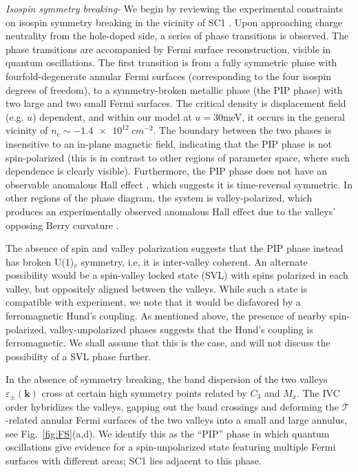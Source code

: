 \documentclass[aps,pra,twocolumn,superscriptaddress,10pt,article,nofootinbib,showpacs,longbibliography]{revtex4-1}
\begin{document}
\emph{Isospin symmetry breaking-}
We begin by reviewing the experimental constraints on isospin symmetry breaking in the vicinity of SC1 \cite{Zhou2021_ABCmetals,Zhou_ABCSC}.
Upon approaching charge neutrality from  the  hole-doped  side,  a  series  of  phase  transitions  is  observed. 
The phase transitions are accompanied by Fermi surface reconstruction, visible in quantum oscillations.
The first transition is from a fully symmetric phase with fourfold-degenerate annular Fermi surfaces (corresponding to the four isospin degrees of freedom), to a symmetry-broken metallic phase (the PIP phase) with two large and two small Fermi surfaces.
The critical density is displacement field (e.g. $u$) dependent, and within our model at $u = 30$meV, it occurs in the general vicinity of $n_e \sim \SI{-1.4e12}{cm^{-2}}$.
The boundary between the two phases is insensitive to an in-plane magnetic field, indicating that the PIP phase is not spin-polarized (this is in contrast to other regions of parameter space, where such dependence is clearly visible). 
Furthermore, the PIP phase does not have an observable anomalous Hall effect \cite{AndreaPrivate}, which suggests it is time-reversal symmetric.
In other regions of the phase diagram, the system is valley-polarized, which produces an experimentally observed anomalous Hall effect due to the valleys' opposing Berry curvature \cite{Zhou2021_ABCmetals, SM}.

The absence of spin and valley polarization suggests that the PIP phase instead has broken U(1)$_v$ symmetry, i.e, it is inter-valley coherent.
An alternate possibility would be a spin-valley locked state (SVL) with spins polarized in each valley, but oppositely aligned between the valleys.
While such a state is compatible with experiment, we note that it would be disfavored by a ferromagnetic Hund's coupling. As mentioned above, the presence of nearby spin-polarized, valley-unpolarized phases suggests that the Hund's coupling is ferromagnetic. We shall assume that this is the case, and will not discuss the possibility of a SVL phase further.

In the absence of symmetry breaking, the band dispersion of the two valleys $\varepsilon_{\pm}(\mathbf{k})$ cross at certain high symmetry points related by $C_3$ and $M_x$. 
The IVC order hybridizes the valleys, gapping out the band crossings and deforming the $\mathcal{T}$-related annular Fermi surfaces of the two valleys into a small and large annulus, see Fig.~\ref{fig:FS}(a,d).
We identify this as the ``PIP'' phase in which quantum oscillations give evidence for a spin-unpolarized state featuring multiple Fermi surfaces with different areas; SC1 lies adjacent to this phase. 
\end{document}
